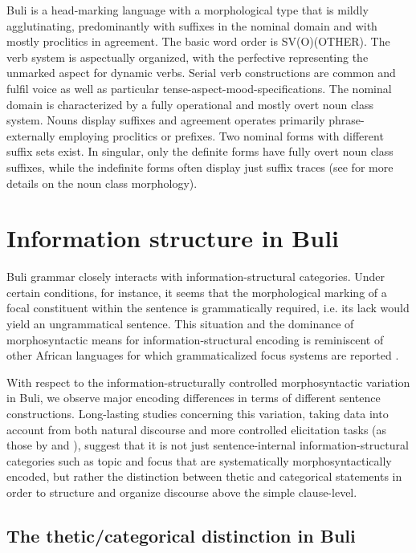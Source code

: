 \documentclass[output=paper]{langsci/langscibook}
\begin{document}
Buli is a head-marking language with a morphological type that is mildly agglutinating, predominantly with suffixes in the nominal domain and with mostly proclitics in agreement. The basic word order is SV(O)(OTHER). The verb system is aspectually organized, with the perfective representing the unmarked aspect for dynamic verbs. Serial verb constructions are common and fulfil voice as well as particular tense-aspect-mood-specifications. The nominal domain is characterized by a fully operational and mostly overt noun class system. Nouns display suffixes and agreement operates primarily phrase-externally employing proclitics or prefixes. Two nominal forms with different suffix sets exist. In singular, only the definite forms have fully overt noun class suffixes, while the indefinite forms often display just suffix traces (see \citealt{Schwarz2007buli} for more details on the noun class morphology).

\section{Information structure in Buli}\label{sec:schwarz:3}

Buli grammar closely interacts with information-structural categories. Under certain conditions, for instance, it seems that the morphological marking of a focal constituent within the sentence is grammatically required, i.e. its lack would yield an ungrammatical sentence. This situation and the dominance of morphosyntactic means for information-structural encoding is reminiscent of other African languages for which grammaticalized focus systems are reported \citep{HymanWatters1984,Robert2000,Wolff2005}. 

With respect to the information-structurally controlled morphosyntactic variation in Buli, we observe major encoding differences in terms of different sentence constructions. Long-lasting studies concerning this variation, taking data into account from both natural discourse and more controlled elicitation tasks (as those by \citealt{SkopeteasEtAl2006} and \citealt{Schwarz2007buli}), suggest that it is not just sentence-internal information-structural categories such as topic and focus that are systematically morphosyntactically encoded, but rather the distinction between thetic and categorical statements in order to structure and organize discourse above the simple clause-level. 

\subsection{The thetic/categorical distinction in Buli}\label{sec:schwarz:3.1}
\end{document}
